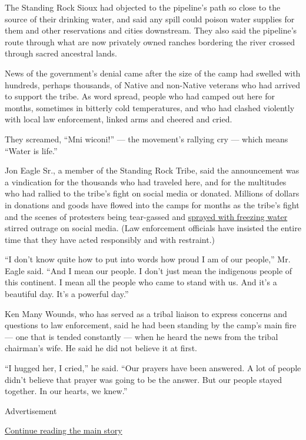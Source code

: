 The Standing Rock Sioux had objected to the pipeline's path so close to
the source of their drinking water, and said any spill could poison
water supplies for them and other reservations and cities downstream.
They also said the pipeline's route through what are now privately owned
ranches bordering the river crossed through sacred ancestral lands.

News of the government's denial came after the size of the camp had
swelled with hundreds, perhaps thousands, of Native and non-Native
veterans who had arrived to support the tribe. As word spread, people
who had camped out here for months, sometimes in bitterly cold
temperatures, and who had clashed violently with local law enforcement,
linked arms and cheered and cried.

They screamed, ``Mni wiconi!'' --- the movement's rallying cry --- which
means ``Water is life.''

Jon Eagle Sr., a member of the Standing Rock Tribe, said the
announcement was a vindication for the thousands who had traveled here,
and for the multitudes who had rallied to the tribe's fight on social
media or donated. Millions of dollars in donations and goods have flowed
into the camps for months as the tribe's fight and the scenes of
protesters being tear-gassed and
\href{http://www.nytimes.com/2016/11/21/us/dakota-access-pipeline-protesters-police.html}{sprayed
with freezing water} stirred outrage on social media. (Law enforcement
officials have insisted the entire time that they have acted responsibly
and with restraint.)

``I don't know quite how to put into words how proud I am of our
people,'' Mr. Eagle said. ``And I mean our people. I don't just mean the
indigenous people of this continent. I mean all the people who came to
stand with us. And it's a beautiful day. It's a powerful day.''

Ken Many Wounds, who has served as a tribal liaison to express concerns
and questions to law enforcement, said he had been standing by the
camp's main fire --- one that is tended constantly --- when he heard the
news from the tribal chairman's wife. He said he did not believe it at
first.

``I hugged her, I cried,'' he said. ``Our prayers have been answered. A
lot of people didn't believe that prayer was going to be the answer. But
our people stayed together. In our hearts, we knew.''

Advertisement

\protect\hyperlink{after-bottom}{Continue reading the main story}

